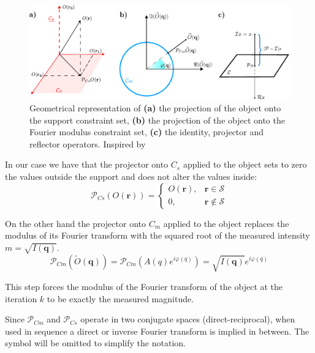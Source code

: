 \begin{figure}[H]
    \centering
    \includegraphics[width=\textwidth]{figures/Intro/projections.pdf}
    \caption{Geometrical representation of \textbf{(a)} the projection of the object onto the support constraint set,   
    \textbf{(b)} the projection of the object onto the Fourier modulus constraint set,
    \textbf{(c)} the identity, projector and reflector operators. Inspired by \cite{marchesini_unified_2007}}
    \label{fig:projections}
\end{figure}

In our case we have that the projector onto $C_s$ applied to the object sets to zero the values outside the support and does not 
alter the values inside: 
\begin{equation}
    \mathcal{P}_{Cs}(O(\mathbf{r})) = 
    \begin{cases}
        O(\mathbf{r}), & \mathbf{r} \in \mathcal{S} \\
        0,  &  \mathbf{r} \notin \mathcal{S}
     \end{cases}
\end{equation}

On the other hand the projector onto $C_m$ applied to the object replaces the modulus of its Fourier transform with the 
squared root of the measured intensity $m = \sqrt{I(\mathbf{q})}$. 
\begin{equation}
    \mathcal{P}_{Cm}(\widetilde{O}(\mathbf{q})) = \mathcal{P}_{Cm}(A(q)e^{i\varphi(q)}) = \sqrt{I(\mathbf{q})}e^{i\varphi(q)}
    \label{eq:modulus_projection}
\end{equation}

This step forces the modulus of the Fourier transform of the object at the iteration $k$ to be exactly the measured magnitude.  

Since $\mathcal{P}_{Cm}$ and $\mathcal{P}_{Cs}$ operate in two conjugate spaces (direct-reciprocal), when used in sequence 
a direct or inverse Fourier transform is implied in between. The symbol will be omitted to simplify the notation. 

